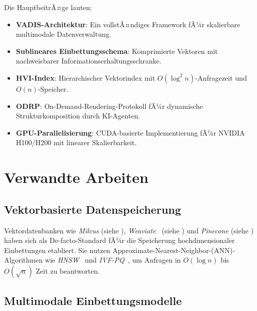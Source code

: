 ﻿\documentclass[12pt,a4paper]{article}
\begin{document}
Die HauptbeitrÃ¤ge lauten:
\begin{itemize}[leftmargin=1.2em, itemsep=0pt, topsep=2pt]
  \item \textbf{VADIS-Architektur}: Ein vollstÃ¤ndiges Framework fÃ¼r 
        skalierbare multimodale Datenverwaltung.
  \item \textbf{Sublineares Einbettungsschema}: Komprimierte Vektoren 
        mit nachweisbarer Informationserhaltungsschranke.
  \item \textbf{HVI-Index}: Hierarchischer Vektorindex mit 
        $O(\log^2 n)$-Anfragezeit und $O(n)$-Speicher.
  \item \textbf{ODRP}: On-Demand-Rendering-Protokoll fÃ¼r 
        dynamische Strukturkomposition durch KI-Agenten.
  \item \textbf{GPU-Parallelisierung}: CUDA-basierte Implementierung 
        fÃ¼r NVIDIA H100/H200 mit linearer Skalierbarkeit.
\end{itemize}

\section{Verwandte Arbeiten}
\label{sec:related}

\subsection{Vektorbasierte Datenspeicherung}

Vektordatenbanken wie \textit{Milvus} (siehe \cite{wang2021milvus}), 
\textit{Weaviate}~ (siehe \cite{weaviate2023}) und \textit{Pinecone} (siehe \cite{pinecone2022}) 
haben sich als De-facto-Standard fÃ¼r die Speicherung hochdimensionaler 
Einbettungen etabliert. Sie nutzen Approximate-Nearest-Neighbor-(ANN)-Algorithmen 
wie \textit{HNSW}~\cite{malkov2018hnsw} und \textit{IVF-PQ}~\cite{johnson2019faiss}, 
um Anfragen in $O(\log n)$ bis $O(\sqrt{n})$ Zeit zu beantworten.

\subsection{Multimodale Einbettungsmodelle}
\end{document}
